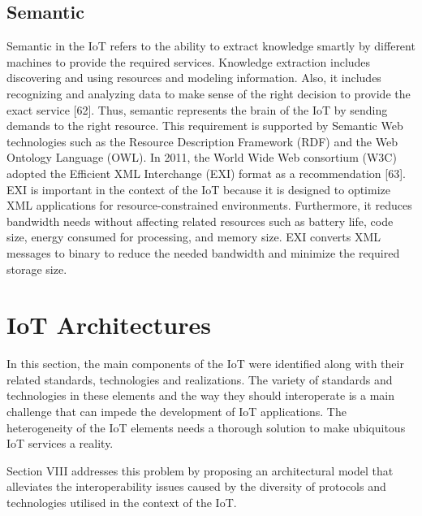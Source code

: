 \subsection{Semantic}

Semantic in the IoT refers to the ability to extract knowledge smartly by different machines to provide the required services.
Knowledge extraction includes discovering and using resources and modeling information.
Also, it includes recognizing and analyzing data to make sense of the right decision to provide the exact service [62]. 
Thus, semantic represents the brain of the IoT by sending demands to the right resource. 
This requirement is supported by Semantic Web technologies such as the Resource Description Framework (RDF) and the Web Ontology
Language (OWL).
In 2011, the World Wide Web consortium (W3C) adopted the Efficient XML Interchange (EXI) format as a recommendation [63].
EXI is important in the context of the IoT because it is designed to optimize XML applications for resource-constrained environments. 
Furthermore, it reduces bandwidth needs without affecting related resources such as battery life, code size, energy consumed for processing, and memory size. 
EXI converts XML messages to binary to reduce the needed bandwidth and minimize the required storage size.



\section{IoT Architectures}
In this section, the main components of the IoT were identified along with their related standards, technologies and realizations.
The variety of standards and technologies in these elements and the way they should interoperate is a main challenge that can impede the development of IoT applications.
The heterogeneity of the IoT elements needs a thorough solution to make ubiquitous IoT services a reality. 

Section VIII addresses this problem by proposing an architectural model that alleviates the interoperability issues caused by the diversity of protocols and technologies utilised in the context of the IoT.


